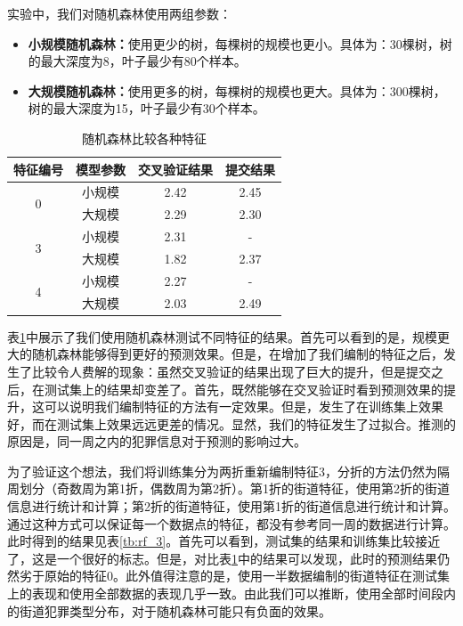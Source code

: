 实验中，我们对随机森林使用两组参数：

\begin{itemize}
    \item \textbf{小规模随机森林：}使用更少的树，每棵树的规模也更小。具体为：30棵树，树的最大深度为8，叶子最少有80个样本。
    \item \textbf{大规模随机森林：}使用更多的树，每棵树的规模也更大。具体为：300棵树，树的最大深度为15，叶子最少有30个样本。
\end{itemize}

    \begin{table}[hb]
    \centering
    \caption{随机森林比较各种特征}
    \label{tb:rf}
    \begin{tabular}{|c|c|c|c|}
    \hline
    特征编号               & 模型参数 & 交叉验证结果 & 提交结果 \\ \hline
    \multirow{2}{*}{0} & 小规模  & 2.42   & 2.45 \\ \cline{2-4} 
                       & 大规模  & 2.29   & 2.30 \\ \hline
    \multirow{2}{*}{3} & 小规模  & 2.31   & -    \\ \cline{2-4} 
                       & 大规模  & 1.82   & 2.37 \\ \hline
    \multirow{2}{*}{4} & 小规模  & 2.27   & -    \\ \cline{2-4} 
                       & 大规模  & 2.03   & 2.49 \\ \hline
    \end{tabular}
\end{table}

表\ref{tb:rf}中展示了我们使用随机森林测试不同特征的结果。首先可以看到的是，规模更大的随机森林能够得到更好的预测效果。但是，在增加了我们编制的特征之后，发生了比较令人费解的现象：虽然交叉验证的结果出现了巨大的提升，但是提交之后，在测试集上的结果却变差了。首先，既然能够在交叉验证时看到预测效果的提升，这可以说明我们编制特征的方法有一定效果。但是，发生了在训练集上效果好，而在测试集上效果远远更差的情况。显然，我们的特征发生了过拟合。推测的原因是，同一周之内的犯罪信息对于预测的影响过大。

为了验证这个想法，我们将训练集分为两折重新编制特征3，分折的方法仍然为隔周划分（奇数周为第1折，偶数周为第2折）。第1折的街道特征，使用第2折的街道信息进行统计和计算；第2折的街道特征，使用第1折的街道信息进行统计和计算。通过这种方式可以保证每一个数据点的特征，都没有参考同一周的数据进行计算。此时得到的结果见表\ref{tb:rf_3}。首先可以看到，测试集的结果和训练集比较接近了，这是一个很好的标志。但是，对比表\ref{tb:rf}中的结果可以发现，此时的预测结果仍然劣于原始的特征0。此外值得注意的是，使用一半数据编制的街道特征在测试集上的表现和使用全部数据的表现几乎一致。由此我们可以推断，使用全部时间段内的街道犯罪类型分布，对于随机森林可能只有负面的效果。

